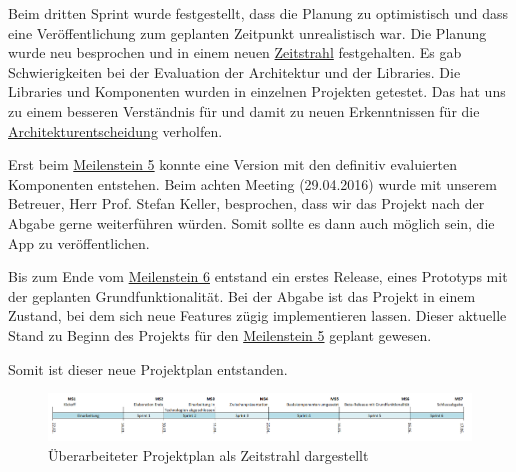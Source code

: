 Beim dritten Sprint wurde festgestellt, dass die Planung zu optimistisch und dass eine Veröffentlichung zum geplanten Zeitpunkt unrealistisch war. 
Die Planung wurde neu besprochen und in einem neuen \hyperref[image-project-plan-timeline2]{Zeitstrahl} festgehalten. 
Es gab Schwierigkeiten bei der Evaluation der Architektur und der Libraries. 
Die Libraries und Komponenten wurden in einzelnen Projekten getestet. 
Das hat uns zu einem besseren Verständnis für  und damit zu neuen Erkenntnissen für die \hyperref[tb-evaluation-architektur]{Architekturentscheidung} verholfen. 

Erst beim \hyperref[pm-ms5]{Meilenstein 5} konnte eine Version mit den definitiv evaluierten Komponenten entstehen. 
Beim achten Meeting (29.04.2016) wurde mit unserem Betreuer, Herr Prof. Stefan Keller, besprochen, dass wir das Projekt nach der Abgabe gerne weiterführen würden.
Somit sollte es dann auch möglich sein, die App zu veröffentlichen.

Bis zum Ende vom \hyperref[pm-ms6]{Meilenstein 6} entstand ein erstes Release, eines Prototyps mit der geplanten Grundfunktionalität. 
Bei der Abgabe ist das Projekt in einem Zustand, bei dem sich neue Features zügig implementieren lassen.
Dieser aktuelle Stand zu Beginn des Projekts für den \hyperref[pm-ms5]{Meilenstein 5} geplant gewesen.

Somit ist dieser neue Projektplan entstanden.

\begin{figure}[H]
	\centering
	\includegraphics[width=\textwidth]{images/projektmanagement/zeitstrahl_v2.png}
	\caption{Überarbeiteter Projektplan als Zeitstrahl dargestellt}
	\label{image-project-plan-timeline2}
\end{figure}




